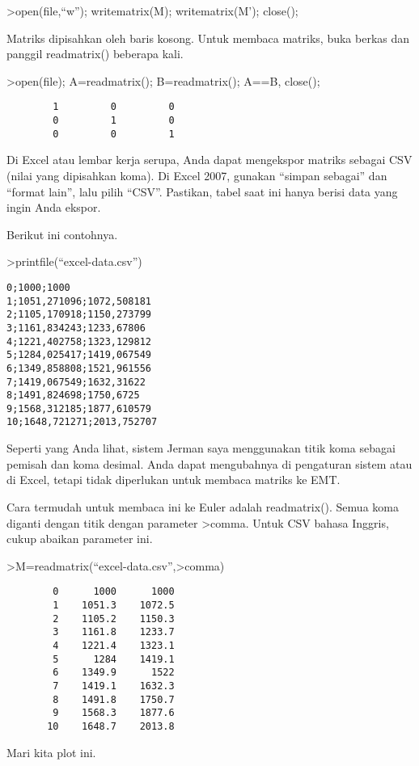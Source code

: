 \documentclass[
]{book}
\begin{document}
\textgreater open(file,``w''); writematrix(M); writematrix(M'); close();

Matriks dipisahkan oleh baris kosong. Untuk membaca matriks, buka berkas dan panggil readmatrix() beberapa kali.

\textgreater open(file); A=readmatrix(); B=readmatrix(); A==B, close();

\begin{verbatim}
        1         0         0 
        0         1         0 
        0         0         1 
\end{verbatim}

Di Excel atau lembar kerja serupa, Anda dapat mengekspor matriks sebagai CSV (nilai yang dipisahkan koma). Di Excel 2007, gunakan ``simpan sebagai'' dan ``format lain'', lalu pilih ``CSV''. Pastikan, tabel saat ini hanya berisi data yang ingin Anda ekspor.

Berikut ini contohnya.

\textgreater printfile(``excel-data.csv'')

\begin{verbatim}
0;1000;1000
1;1051,271096;1072,508181
2;1105,170918;1150,273799
3;1161,834243;1233,67806
4;1221,402758;1323,129812
5;1284,025417;1419,067549
6;1349,858808;1521,961556
7;1419,067549;1632,31622
8;1491,824698;1750,6725
9;1568,312185;1877,610579
10;1648,721271;2013,752707
\end{verbatim}

Seperti yang Anda lihat, sistem Jerman saya menggunakan titik koma sebagai pemisah dan koma desimal. Anda dapat mengubahnya di pengaturan sistem atau di Excel, tetapi tidak diperlukan untuk membaca matriks ke EMT.

Cara termudah untuk membaca ini ke Euler adalah readmatrix(). Semua koma diganti dengan titik dengan parameter \textgreater comma. Untuk CSV bahasa Inggris, cukup abaikan parameter ini.

\textgreater M=readmatrix(``excel-data.csv'',\textgreater comma)

\begin{verbatim}
        0      1000      1000 
        1    1051.3    1072.5 
        2    1105.2    1150.3 
        3    1161.8    1233.7 
        4    1221.4    1323.1 
        5      1284    1419.1 
        6    1349.9      1522 
        7    1419.1    1632.3 
        8    1491.8    1750.7 
        9    1568.3    1877.6 
       10    1648.7    2013.8 
\end{verbatim}

Mari kita plot ini.
\end{document}

